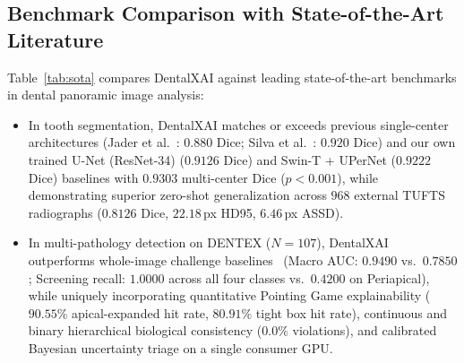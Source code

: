 \documentclass[review]{elsarticle}
\begin{document}
\subsection{Benchmark Comparison with State-of-the-Art Literature}
Table~\ref{tab:sota} compares DentalXAI against leading state-of-the-art benchmarks in dental panoramic image analysis:
\begin{itemize}
    \item In tooth segmentation, DentalXAI matches or exceeds previous single-center architectures (Jader et al.~\cite{jader2018deep}: $0.880$ Dice; Silva et al.~\cite{silva2021automatic}: $0.920$ Dice) and our own trained U-Net (ResNet-34) ($0.9126$ Dice) and Swin-T + UPerNet ($0.9222$ Dice) baselines with $0.9303$ multi-center Dice ($p < 0.001$), while demonstrating superior zero-shot generalization across $968$ external TUFTS radiographs ($0.8126$ Dice, $22.18$\,px HD95, $6.46$\,px ASSD).
    \item In multi-pathology detection on DENTEX ($N=107$), DentalXAI outperforms whole-image challenge baselines~\cite{hamamci2023dentex} (Macro AUC: $0.9490$ vs.\ $0.7850$; Screening recall: $1.0000$ across all four classes vs.\ $0.4200$ on Periapical), while uniquely incorporating quantitative Pointing Game explainability ($90.55\%$ apical-expanded hit rate, $80.91\%$ tight box hit rate), continuous and binary hierarchical biological consistency ($0.0\%$ violations), and calibrated Bayesian uncertainty triage on a single consumer GPU.
\end{itemize}
\end{document}

